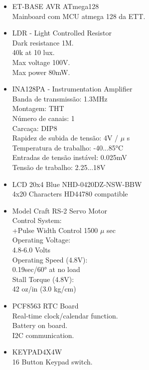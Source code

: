 \newpage




\newpage

\begin{minipage}[t]{.60\linewidth}
	\begin{itemize}
		\setlength\itemsep{-0.3em}
		\item ET-BASE AVR ATmega128 \\
		Mainboard com MCU atmega 128 da ETT. \\
		\item LDR - Light Controlled Resistor \\
		Dark resistance 1M.\\
		40k at 10 lux.\\
		Max voltage 100V.\\
		Max power 80mW.\\
		\item INA128PA - Instrumentation Amplifier \\
		Banda de transmissão: 1.3MHz \\
		Montagem: THT \\
		Número de canais: 1 \\
		Carcaça: DIP8 \\
		Rapidez de subida de tensão: 4V / $\mu$ s \\
		Temperatura de trabalho: -40...85°C \\
		Entradas de tensão instável: 0.025mV \\
		Tensão de trabalho: 2.25...18V \\
		\item LCD 20x4 Blue NHD-0420DZ-NSW-BBW \\
		4x20 Characters HD44780 compatible\\
	\end{itemize}
\end{minipage}
\begin{minipage}[t]{.31\linewidth}
	\begin{itemize}
		\setlength\itemsep{-0.3em}
		\item Model Craft RS-2 \- Servo Motor \\
		Control System:\\
		+Pulse Width Control 1500 $\mu$ sec \\
		Operating Voltage:\\ 
		4.8-6.0 Volts \\
		Operating Speed (4.8V):\\
		0.19sec/60° at no load \\
		Stall Torque (4.8V):\\
		42 oz/in (3.0 kg/cm) \\
		\item PCF8563 RTC Board \\
		Real-time clock/calendar function. \\ 
		Battery on board. \\
		I2C communication. \\
		\item KEYPAD4X4W \\
		16 Button Keypad switch. \\
	\end{itemize}
\end{minipage}\\
